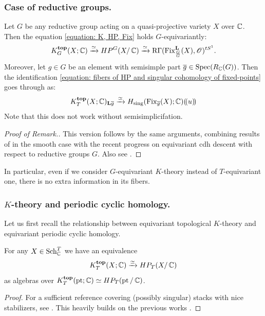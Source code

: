 \subsubsection{Case of reductive groups.}

\begin{remark}
Let $G$ be any reductive group acting on a quasi-projective variety $X$ over $\operatorname{\mathbb{C}}$. Then the equation \eqref{equation: K, HP, Fix} holds $G$-equivariantly:
\begin{equation*}
    K^{\mathbf{top}}_{G}(X; \operatorname{\mathbb{C}}) \xrightarrow{\simeq} HP^G(X / \operatorname{\mathbb{C}}) \xrightarrow{\simeq} \operatorname{R\Gamma}(\operatorname{Fix}^{\mathbf{L}}_{\frac{G}{G}}(X), \operatorname{\mathscr{O}})^{tS^1}.
\end{equation*}
Moreover, let $g \in G$ be an element with semisimple part $\overline{g} \in \operatorname{Spec}(R_{\operatorname{\mathbb{C}}}(G))$. Then the identification \eqref{equation: fibers of HP and singular cohomology of fixed-points} goes through as:
\begin{equation*}\label{equation: fibers and singular cohomology of fixed-points semisimplification}
    K^{\mathbf{top}}_T(X; \operatorname{\mathbb{C}})_{\mathbf{L} \overline{g}} \xrightarrow{\simeq} H_{\mathrm{sing}}(\operatorname{Fix}_{\overline{g}}(X); \operatorname{\mathbb{C}})(\!( u )\!)
\end{equation*}
Note that this does {not} work without semisimplicifation.
\end{remark}
\begin{proof}[Proof of Remark.]    
This version follows by the same arguments, combining results of \cite{Chen20} in the smooth case with the recent progress on equivariant cdh descent \cite{LS25} with respect to reductive groups $G$. Also see \cite[Appendix B]{Low25}.
\end{proof}

In particular, even if we consider $G$-equivariant $K$-theory instead of $T$-equivariant one, there is no extra information in its fibers.


\subsubsection{$K$-theory and periodic cyclic homology.}
Let us first recall the relationship between equivariant topological $K$-theory and equivariant periodic cyclic homology. 

\begin{proposition}\label{theorem: topological K-theory and HP}
For any $X \in \operatorname{Sch}^{T}_{\operatorname{\mathbb{C}}}$ we have an equivalence
\begin{equation*}
K^{\mathbf{top}}_T(X; \operatorname{\mathbb{C}}) \xrightarrow{\simeq} HP_T(X / \operatorname{\mathbb{C}})    
\end{equation*}
as algebras over $K_T^{\mathbf{top}}(\operatorname{pt}; \operatorname{\mathbb{C}}) \simeq HP_T(\operatorname{pt} / \operatorname{\mathbb{C}})$.
\end{proposition}
\begin{proof}
For a sufficient reference covering (possibly singular) stacks with nice stabilizers, see \cite{Kha23}. This heavily builds on the previous works \cite{Bla16, Kon21, HLP20, ES21}. 
\end{proof}





